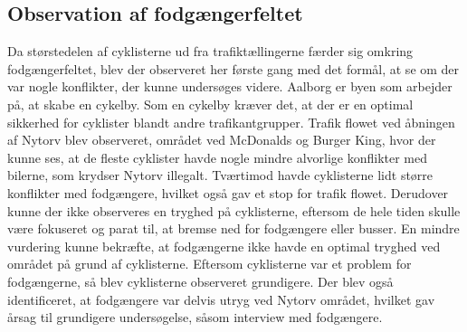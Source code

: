 \subsection{Observation af fodgængerfeltet}
\label{sub:foerste_obs}
Da størstedelen af cyklisterne ud fra trafiktællingerne færder sig omkring fodgængerfeltet, blev der observeret her første gang med det formål, at se om der var nogle konflikter, der kunne undersøges videre.
Aalborg er byen som arbejder på, at skabe en cykelby.\autocite{aabcykelby}
Som en cykelby kræver det, at der er en optimal sikkerhed for cyklister blandt andre trafikantgrupper. Trafik flowet ved åbningen af Nytorv blev observeret, området ved McDonalds og Burger King, hvor der kunne ses, at de fleste cyklister havde nogle mindre alvorlige konflikter med bilerne, som krydser Nytorv illegalt. Tværtimod havde cyklisterne lidt større konflikter med fodgængere, hvilket også gav et stop for trafik flowet. Derudover kunne der ikke observeres en tryghed på cyklisterne, eftersom de hele tiden skulle være fokuseret og parat til, at bremse ned for fodgængere eller busser. En mindre vurdering kunne bekræfte, at fodgængerne ikke havde en optimal tryghed ved området på grund af cyklisterne.
Eftersom cyklisterne var et problem for fodgængerne, så blev cyklisterne observeret grundigere. Der blev også identificeret, at fodgængere var delvis utryg ved Nytorv området, hvilket gav årsag til grundigere undersøgelse, såsom interview med fodgængere.

